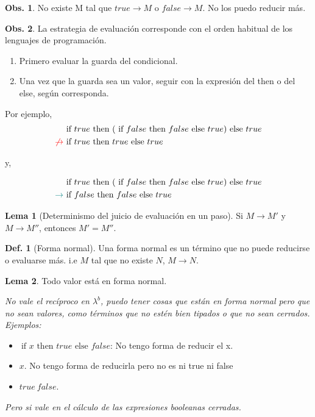 \documentclass{report}
\theoremstyle{definition} %
\newtheorem{lemma}{Lema}[chapter]
\newtheorem{definition}{Def.}[chapter]
\newtheorem{observation}{Obs.}[chapter]
\newcommand{\lambdab}{\lambda^b}
\newcommand{\ifte}[3]{\ \text{if } #1 \text{ then } #2 \text{ else } #3}
\newcommand{\app}[2]{#1 \ #2} %
\newcommand{\reduce}[2]{#1 \to #2}
\begin{document}
\begin{observation}
    No existe M tal que $\reduce{true}{M}$ o $\reduce{false}{M}$. No los puedo reducir más.
\end{observation}

\begin{observation}
    La estrategia de evaluación corresponde con el orden habitual de los
    lenguajes de programación.

    \begin{enumerate}
        \item Primero evaluar la guarda del condicional.
        \item Una vez que la guarda sea un valor, seguir con la expresión del
        then o del else, según corresponda.
    \end{enumerate}

    Por ejemplo,
    \begin{align*}
        &\ifte
            {true}
            {(\ifte{false}{false}{true})}
            {true}\\
        \textcolor{red}{\not\to} &\ifte{true}{true}{true}
    \end{align*}

    y,

    \begin{align*}
        &\ifte
            {true}
            {(\ifte{false}{false}{true})}
            {true}\\
        \textcolor{teal}{\to} &\ifte{false}{false}{true}
    \end{align*}
\end{observation}

\begin{lemma}[Determinismo del juicio de evaluación en un paso]
    Si $\reduce{M}{M'}$ y $\reduce{M}{M''}$, entonces $M' = M''$.
\end{lemma}

\begin{definition}[Forma normal]
    Una forma normal es un término que no puede reducirse o evaluarse más. i.e
    $M$ tal que no existe $N$, $\reduce{M}{N}$.
\end{definition}
\begin{lemma}
    Todo valor está en forma normal.

    \textit{No vale el recíproco en $\lambdab$, puedo tener cosas que están en forma normal pero que no sean valores, como términos que no estén bien tipados o que no sean cerrados. Ejemplos:}
    
    \begin{itemize}
        \item $\ifte{x}{true}{false}$: No tengo forma de reducir el x.
        \item $x$. No tengo forma de reducirla pero no es ni true ni false
        \item $\app{true}{false}$.
    \end{itemize}
    
    \textit{Pero si vale en el cálculo de las expresiones booleanas cerradas.}
\end{lemma}
\end{document}
